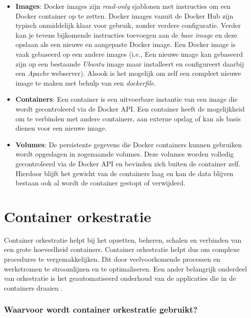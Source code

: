 \begin{itemize}
        \item \textbf{Images}: Docker images zijn \textit{read-only} sjablonen met instructies om een Docker container op te zetten. Docker images vanuit de Docker Hub zijn typisch onmiddelijk klaar voor gebruik, zonder verdere configuratie. Verder kan je tevens bijkomende instructies toevoegen aan de \textit{base image} en deze opslaan als een nieuwe en aangepaste Docker image. Een Docker image is vaak gebaseerd op een andere images (i.e., Een nieuwe image kan gebaseerd zijn op een bestaande \textit{Ubuntu} image maar installeert en configureert daarbij een \textit{Apache} webserver). Alsook is het mogelijk om zelf een compleet nieuwe image te maken met behulp van een \textit{dockerfile}.
        \item \textbf{Containers}: Een container is een uitvoerbare instantie van een image die wordt gecontroleerd via de Docker API. Een container heeft de mogelijkheid om te verbinden met andere containers, aan externe opslag of kan als basis dienen voor een nieuwe image.
        \item \textbf{Volumes}: De persistente gegevens die Docker containers kunnen gebruiken wordt opgeslagen in zogenaamde volumes. Deze volumes worden volledig gecontroleerd via de Docker API en bevinden zich buiten de container zelf. Hierdoor blijft het gewicht van de containers laag en kan de data blijven bestaan ook al wordt de container gestopt of verwijderd.
\end{itemize}

\section{Container orkestratie}
Container orkestratie helpt bij het opzetten, beheren, schalen en verbinden van een grote hoeveelheid containers. Container orkestratie helpt dus om complexe procedures te vergemakkelijken. Dit door veelvoorkomende processen en werkstromen te stroomlijnen en te optimaliseren. Een ander belangrijk onderdeel van orkestratie is het geautomatiseerd onderhoud van de applicaties die in de containers draaien \autocite{RedHat2021}.

\subsubsection{Waarvoor wordt container orkestratie gebruikt?}

